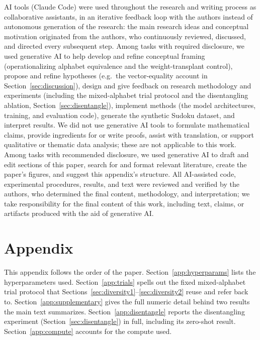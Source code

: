 \documentclass{article} %
\begin{document}
AI tools (Claude Code) were used throughout the research and writing
process as collaborative assistants, in an iterative feedback loop with
the authors instead of autonomous generation of the research: the main
research ideas and conceptual motivation originated from the authors,
who continuously reviewed, discussed, and directed every subsequent
step. Among tasks with required disclosure, we used generative AI to
help develop and refine conceptual framing (operationalizing alphabet
equivalence and the weight-transplant control), propose and refine
hypotheses (e.g.\ the vector-equality account in
Section~\ref{sec:discussion}), design and give feedback on research
methodology and experiments (including the mixed-alphabet trial
protocol and the disentangling ablation, Section~\ref{sec:disentangle}),
implement methods (the model architectures, training, and evaluation
code), generate the synthetic Sudoku dataset, and interpret results. We
did not use generative AI tools to formulate mathematical claims,
provide ingredients for or write proofs, assist with translation, or
support qualitative or thematic data analysis; these are not applicable
to this work. Among tasks with recommended disclosure, we used
generative AI to draft and edit sections of this paper, search for and
format relevant literature, create the paper's figures, and suggest
this appendix's structure. All AI-assisted code, experimental
procedures, results, and text were reviewed and verified by the
authors, who determined the final content, methodology, and
interpretation; we take responsibility for the final content of this
work, including text, claims, or artifacts produced with the aid of
generative AI.




\appendix
\section{Appendix}

This appendix follows the order of the paper.
Section~\ref{app:hyperparams} lists the hyperparameters used.
Section~\ref{app:trials} spells out the fixed mixed-alphabet trial
protocol that Sections~\ref{sec:diversity1}--\ref{sec:diversity2} reuse
and refer back to. Section~\ref{app:supplementary} gives the full
numeric detail behind two results the main text summarizes.
Section~\ref{app:disentangle} reports the disentangling experiment
(Section~\ref{sec:disentangle}) in full, including its zero-shot
result. Section~\ref{app:compute} accounts for the compute used.
\end{document}
